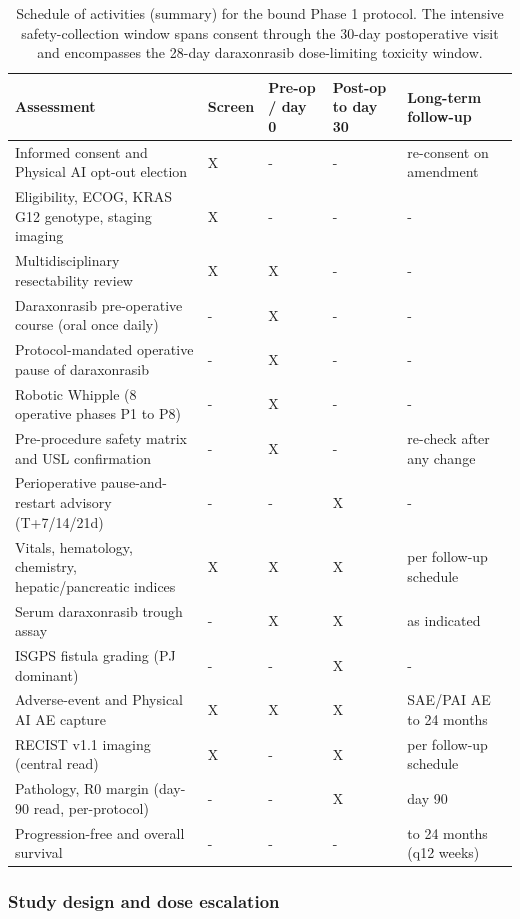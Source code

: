 \begin{table}[t]
\caption{Schedule of activities (summary) for the bound Phase 1 protocol. The
intensive safety-collection window spans consent through the 30-day postoperative
visit and encompasses the 28-day daraxonrasib dose-limiting toxicity window.}
\label{tab:sec05-soa}
\centering
\begin{tabularx}{\textwidth}{L{4.3cm} C{1.4cm} C{1.6cm} C{1.6cm} Y}
\toprule
\textbf{Assessment} & \textbf{Screen} & \textbf{Pre-op / day 0} & \textbf{Post-op to day 30} & \textbf{Long-term follow-up} \\
\midrule
Informed consent and Physical AI opt-out election & X & - & - & re-consent on amendment \\
Eligibility, ECOG, KRAS G12 genotype, staging imaging & X & - & - & - \\
Multidisciplinary resectability review & X & X & - & - \\
Daraxonrasib pre-operative course (oral once daily) & - & X & - & - \\
Protocol-mandated operative pause of daraxonrasib & - & X & - & - \\
Robotic Whipple (8 operative phases P1 to P8) & - & X & - & - \\
Pre-procedure safety matrix and USL confirmation & - & X & - & re-check after any change \\
Perioperative pause-and-restart advisory (T+7/14/21d) & - & - & X & - \\
Vitals, hematology, chemistry, hepatic/pancreatic indices & X & X & X & per follow-up schedule \\
Serum daraxonrasib trough assay & - & X & X & as indicated \\
ISGPS fistula grading (PJ dominant) & - & - & X & - \\
Adverse-event and Physical AI AE capture & X & X & X & SAE/PAI AE to 24 months \\
RECIST v1.1 imaging (central read) & X & - & X & per follow-up schedule \\
Pathology, R0 margin (day-90 read, per-protocol) & - & - & X & day 90 \\
Progression-free and overall survival & - & - & - & to 24 months (q12 weeks) \\
\bottomrule
\end{tabularx}
\end{table}

\subsubsection*{Study design and dose escalation}

